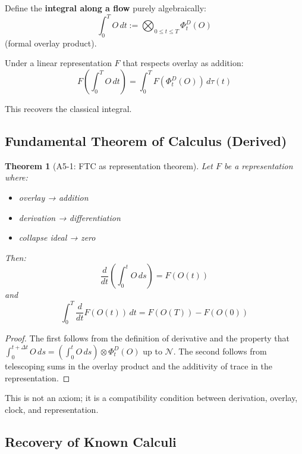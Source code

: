 \documentclass[12pt, oneside]{article}
\newtheorem{theorem}{Theorem}[section]
\newcommand{\N}{\mathcal{N}}
\begin{document}
Define the \textbf{integral along a flow} purely algebraically:
\begin{equation}
\int_0^T O \, dt := \bigotimes_{0 \leq t \leq T} \Phi_t^D(O)
\end{equation}
(formal overlay product).

Under a linear representation $F$ that respects overlay as addition:
\begin{equation}
F\left( \int_0^T O \, dt \right) = \int_0^T F(\Phi_t^D(O)) \, d\tau(t)
\end{equation}

This recovers the classical integral.

\subsection{Fundamental Theorem of Calculus (Derived)}

\begin{theorem}[A5-1: FTC as representation theorem]
Let $F$ be a representation where:
\begin{itemize}
    \item overlay → addition
    \item derivation → differentiation
    \item collapse ideal → zero
\end{itemize}
Then:
\begin{equation}
\frac{d}{dt} \left( \int_0^t O \, ds \right) = F(O(t))
\end{equation}
and
\begin{equation}
\int_0^T \frac{d}{dt} F(O(t)) \, dt = F(O(T)) - F(O(0))
\end{equation}
\end{theorem}

\begin{proof}
The first follows from the definition of derivative and the property that $\int_0^{t+\Delta t} O \, ds = (\int_0^t O \, ds) \otimes \Phi_t^D(O)$ up to $\N$. The second follows from telescoping sums in the overlay product and the additivity of trace in the representation.
\end{proof}

This is not an axiom; it is a compatibility condition between derivation, overlay, clock, and representation.

\subsection{Recovery of Known Calculi}
\end{document}
